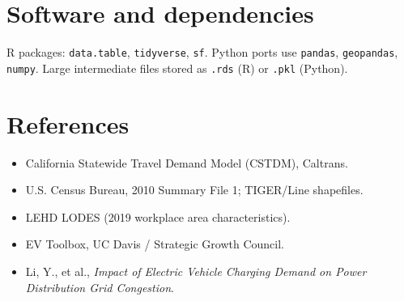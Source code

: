\documentclass[11pt,a4paper]{article}
\begin{document}
\section{Software and dependencies}

R packages: \texttt{data.table}, \texttt{tidyverse}, \texttt{sf}. Python ports use \texttt{pandas}, \texttt{geopandas}, \texttt{numpy}. Large intermediate files stored as \texttt{.rds} (R) or \texttt{.pkl} (Python).

\section*{References}

\begin{itemize}[noitemsep]
  \item California Statewide Travel Demand Model (CSTDM), Caltrans.
  \item U.S. Census Bureau, 2010 Summary File 1; TIGER/Line shapefiles.
  \item LEHD LODES (2019 workplace area characteristics).
  \item EV Toolbox, UC Davis / Strategic Growth Council.
  \item Li, Y., et al., \emph{Impact of Electric Vehicle Charging Demand on Power Distribution Grid Congestion}.
\end{itemize}
\end{document}

